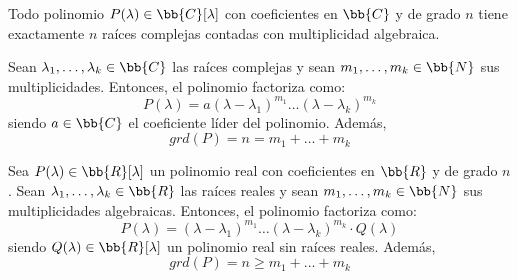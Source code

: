 \begin{teo}
Todo polinomio $P(\lambda) \in \bb{C}[\lambda]$ con coeficientes en $\bb{C}$ y de grado $n$ tiene exactamente $n$ raíces complejas contadas con multiplicidad algebraica.

Sean $\lambda_1, \dots, \lambda_k \in \bb{C}$ las raíces complejas y sean $m_1, \dots, m_k \in \bb{N}$ sus multiplicidades. Entonces, el polinomio factoriza como:
$$P(\lambda) = a (\lambda - \lambda_1)^{m_1} \dots (\lambda - \lambda_k)^{m_k}$$
siendo $a\in \bb{C}$ el coeficiente líder del polinomio. Además,
$$grd(P) = n = m_1 + \dots + m_k$$
\end{teo}

\begin{teo}
Sea $P(\lambda) \in \bb{R}[\lambda]$ un polinomio real con coeficientes en $\bb{R}$ y de grado $n$. Sean $\lambda_1, \dots, \lambda_k \in \bb{R}$ las raíces reales y sean $m_1, \dots, m_k \in \bb{N}$ sus multiplicidades algebraicas. Entonces, el polinomio factoriza como:
$$P(\lambda) = (\lambda - \lambda_1)^{m_1} \dots (\lambda - \lambda_k)^{m_k} \cdot Q(\lambda)$$
siendo $Q(\lambda) \in \bb{R}[\lambda]$ un polinomio real sin raíces reales. Además,
$$grd(P) = n \geq m_1 + \dots + m_k$$
\end{teo}
